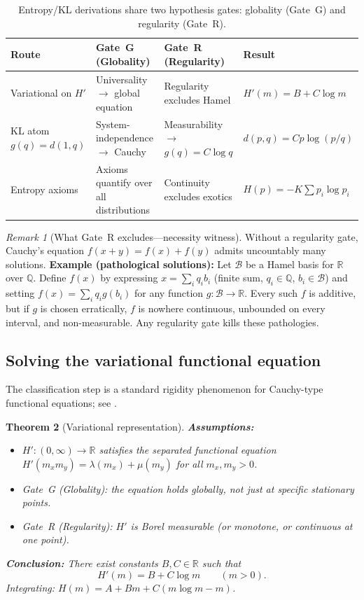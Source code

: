 \documentclass[11pt]{article}
\newtheorem{theorem}{Theorem}[section]
\theoremstyle{definition}
\theoremstyle{remark}
\newtheorem{remark}[theorem]{Remark}
\begin{document}
\begin{table}[h]
\centering
\footnotesize
\begin{tabular}{|l|l|l|l|}
\hline
\textbf{Route} & \textbf{Gate~G (Globality)} & \textbf{Gate~R (Regularity)} & \textbf{Result}\\
\hline
Variational on $H'$ &
Universality $\to$ global equation &
Regularity excludes Hamel &
$H'(m)=B+C\log m$\\
\hline
KL atom $g(q)=d(1,q)$ &
System-independence $\to$ Cauchy &
Measurability $\to$ $g(q)=C\log q$ &
$d(p,q)=Cp\log(p/q)$\\
\hline
Entropy axioms &
Axioms quantify over all distributions &
Continuity excludes exotics &
$H(p)=-K\sum p_i\log p_i$\\
\hline
\end{tabular}
\caption{Entropy/KL derivations share two hypothesis gates: globality (Gate~G) and regularity (Gate~R).}
\end{table}

\begin{remark}[What Gate~R excludes---necessity witness]
Without a regularity gate, Cauchy's equation $f(x+y)=f(x)+f(y)$ admits uncountably many solutions.
\textbf{Example (pathological solutions):} Let $\mathcal{B}$ be a Hamel basis for $\mathbb{R}$ over $\mathbb{Q}$.
Define $f(x)$ by expressing $x=\sum_{i} q_i b_i$ (finite sum, $q_i\in\mathbb{Q}$, $b_i\in\mathcal{B}$)
and setting $f(x)=\sum_i q_i g(b_i)$ for any function $g:\mathcal{B}\to\mathbb{R}$.
Every such $f$ is additive, but if $g$ is chosen erratically, $f$ is nowhere continuous, unbounded
on every interval, and non-measurable.  Any regularity gate kills these pathologies.
\end{remark}

\subsection{Solving the variational functional equation}

The classification step is a standard rigidity phenomenon for Cauchy-type functional equations; see
\cite{Aczel1966,Kuczma2009}.

\begin{theorem}[Variational representation]
\textbf{Assumptions:}
\begin{itemize}
\item $H':(0,\infty)\to\mathbb{R}$ satisfies the separated functional equation
$H'(m_x m_y)=\lambda(m_x)+\mu(m_y)$ for all $m_x,m_y>0$.
\item Gate~G (Globality): the equation holds globally, not just at specific stationary points.
\item Gate~R (Regularity): $H'$ is Borel measurable (or monotone, or continuous at one point).
\end{itemize}
\textbf{Conclusion:}
There exist constants $B,C\in\mathbb{R}$ such that
\[
H'(m)=B+C\log m \qquad(m>0).
\]
Integrating: $H(m)=A + Bm + C(m\log m - m)$.
\end{theorem}
\end{document}
